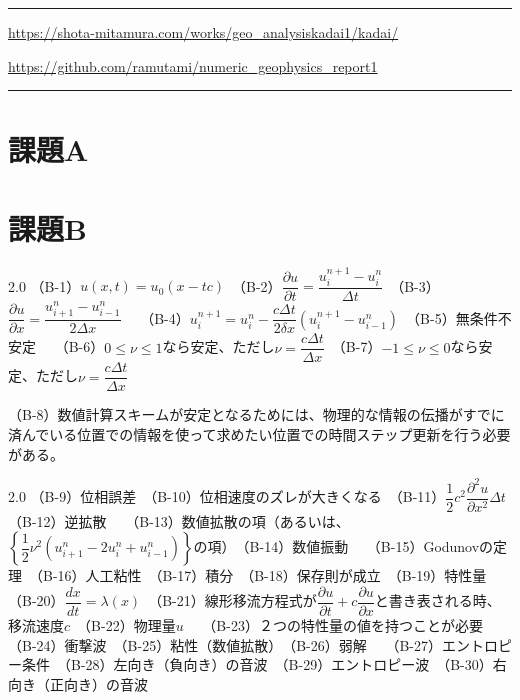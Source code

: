 \documentclass[ja=standard,xelatex]{bxjsarticle}
\newcommand{\vs}[1]{\vskip#1\baselineskip}
\newcommand{\dif}[2]{\dfrac{d#1}{d#2}}
\newcommand{\pdif}[2]{\dfrac{\partial{#1}}{\partial#2}}
\newcommand{\pdiftwice}[2]{\dfrac{\partial^{2}{#1}}{\partial {#2} ^{2}}}
\newcommand{\bracketnormal}[1]{\left(#1\right)}
\newcommand{\curlybracket}[1]{\left\{#1\right\}}
\begin{document}
\maketitle

\hrule

\begin{description}[
  labelwidth=10.5cm,
  labelsep=0.5cm,
  leftmargin=5.8cm,
  style=nextline
]
  \item[数値計算結果の可視化動画置き場：] \href{https://shota-mitamura.com/works/geo_analysiskadai1/kadai/}{https://shota-mitamura.com/works/geo\_analysiskadai1/kadai/}
  \item[コード置き場：] \href{https://github.com/ramutami/numeric_geophysics_report1}{https://github.com/ramutami/numeric\_geophysics\_report1}
\end{description}

\hrule
\vs{1}


\tableofcontents


\section{課題A}
\section{課題B}
\begin{spacing}{2.0}
（B-1）$u\bracketnormal{x,t} = u_0\bracketnormal{x-tc}$　（B-2）$\pdif{u}{t} = \dfrac{u_i^{n+1}-u_i^n}{\Delta t}$　（B-3）$\pdif{u}{x}=\dfrac{u_{i+1}^n-u_{i-1}^n}{2\Delta x}$　
\vs{0}
（B-4）$u_i^{n+1} = u_i^n - \dfrac{c\Delta t}{2\delta x}\bracketnormal{u_i^{n+1}-u_{i-1}^n} $　（B-5）無条件不安定　
\vs{0}（B-6）$0\leq \nu \leq 1$なら安定、ただし$\nu = \dfrac{c\Delta t}{\Delta x}$　（B-7）$-1\leq \nu \leq 0$なら安定、ただし$\nu = \dfrac{c\Delta t}{\Delta x}$　
\vs{0}
\end{spacing}
（B-8）数値計算スキームが安定となるためには、物理的な情報の伝播がすでに済んでいる位置での情報を使って求めたい位置での時間ステップ更新を行う必要がある。
\begin{spacing}{2.0}
（B-9）位相誤差　（B-10）位相速度のズレが大きくなる　（B-11）$\dfrac{1}{2}c^2 \pdiftwice{u}{x}\Delta t$　（B-12）逆拡散　
\vs{0}
（B-13）数値拡散の項（あるいは、$\curlybracket{\dfrac{1}{2}\nu ^2\bracketnormal{u_{i+1}^n - 2u_{i}^n+u_{i-1}^n}}$の項）　（B-14）数値振動　
\vs{0}
（B-15）Godunovの定理　（B-16）人工粘性　（B-17）積分　（B-18）保存則が成立　（B-19）特性量　
\vs{0}
（B-20）$\dif{x}{t}=\lambda\bracketnormal{x}$　（B-21）線形移流方程式が$\pdif{u}{t}+c\pdif{u}{x}$と書き表される時、移流速度$c$　（B-22）物理量$u$　
\vs{0}
（B-23）２つの特性量の値を持つことが必要　（B-24）衝撃波　（B-25）粘性（数値拡散）　（B-26）弱解　
\vs{0}
（B-27）エントロピー条件　（B-28）左向き（負向き）の音波　（B-29）エントロピー波　（B-30）右向き（正向き）の音波
\end{spacing}
\end{document}
